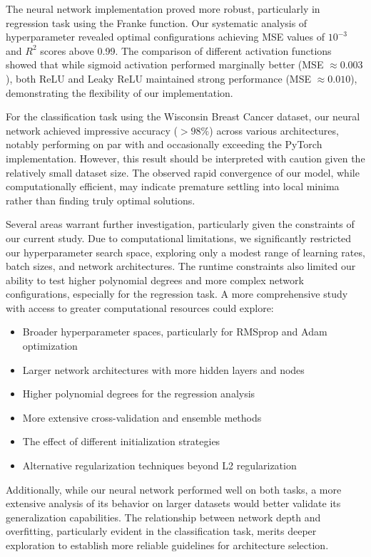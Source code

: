 \documentclass[aps,pra,english,notitlepage,reprint,nofootinbib]{revtex4-1}  %
\begin{document}
The neural network implementation proved more robust, particularly in regression task using the Franke function. Our systematic analysis of hyperparameter revealed optimal configurations achieving MSE values of $10^{-3}$ and $R^2$ scores above 0.99. The comparison of different activation functions showed that while sigmoid activation performed marginally better (MSE $\approx 0.003$), both ReLU and Leaky ReLU maintained strong performance (MSE $\approx 0.010$), demonstrating the flexibility of our implementation.

For the classification task using the Wisconsin Breast Cancer dataset, our neural network achieved impressive accuracy ($>98\%$) across various architectures, notably performing on par with and occasionally exceeding the PyTorch implementation. However, this result should be interpreted with caution given the relatively small dataset size. The observed rapid convergence of our model, while computationally efficient, may indicate premature settling into local minima rather than finding truly optimal solutions.

Several areas warrant further investigation, particularly given the constraints of our current study. Due to computational limitations, we significantly restricted our hyperparameter search space, exploring only a modest range of learning rates, batch sizes, and network architectures. The runtime constraints also limited our ability to test higher polynomial degrees and more complex network configurations, especially for the regression task. A more comprehensive study with access to greater computational resources could explore:

\begin{itemize}
    \item Broader hyperparameter spaces, particularly for RMSprop and Adam optimization
    \item Larger network architectures with more hidden layers and nodes
    \item Higher polynomial degrees for the regression analysis
    \item More extensive cross-validation and ensemble methods
    \item The effect of different initialization strategies
    \item Alternative regularization techniques beyond L2 regularization
\end{itemize}

Additionally, while our neural network performed well on both tasks, a more extensive analysis of its behavior on larger datasets would better validate its generalization capabilities. The relationship between network depth and overfitting, particularly evident in the classification task, merits deeper exploration to establish more reliable guidelines for architecture selection.
\end{document}
